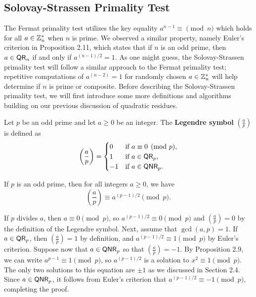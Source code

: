 \subsection{Solovay-Strassen Primality Test}
The Fermat primality test utilizes the key equality $a^{n-1} \equiv \pmod n$ which holds for all $a \in 
\mathbb{Z}_n^*$ when $n$ is prime. We observed a similar property, namely Euler's criterion in Proposition 2.11,
which states that if $n$ is an odd prime, then $a \in {\sf QR}_n$ if and only if $a^{(n-1)/2} = 1$. 
As one might guess, the Solovay-Strassen primality test will follow a similar approach to the 
Fermat primality test; repetitive computations of $a^{(n-2)} = 1$ for randomly chosen 
$a \in \mathbb{Z}_n^*$ will help determine if $n$ is prime or composite. Before describing the 
Solovay-Strassen primality test, we will first introduce some more definitions and algorithms 
building on our previous discussion of quadratic residues. 

\begin{defn}
Let $p$ be an odd prime and let $a \geq 0$ be an integer. The {\bf Legendre symbol} 
$(\frac ap)$ is defined as 
\[ \left( \frac ap \right) = \begin{cases} 0 & \text{if $a \equiv 0 \pmod p$,} \\ 1 & \text{if $a \in {\sf QR}_p$,} \\ -1 & \text{if $a \in {\sf QNR}_p$.} \end{cases} \]
\end{defn}

\begin{thm}
If $p$ is an odd prime, then for all integers $a \geq 0$, we have 
\[ \left( \frac ap \right) \equiv a^{(p-1)/2} \pmod p. \]
\end{thm}
\begin{pf}
If $p$ divides $a$, then $a \equiv 0 \pmod p$, so $a^{(p-1)/2} \equiv 0 \pmod p$ and 
$(\frac ap) = 0$ by the definition of the Legendre symbol. Next, assume that $\gcd(a, p) = 1$. 
If $a \in {\sf QR}_p$, then $(\frac ap) = 1$ by definition, and $a^{(p-1)/2} \equiv 1 \pmod p$ 
by Euler's criterion. Suppose now that $a \in {\sf QNR}_p$ so that $(\frac ap) = -1$. By Proposition 
2.9, we can write $a^{p-1} \equiv 1 \pmod p$, so $a^{(p-1)/2}$ is a solution to $x^2 \equiv 1 
\pmod p$. The only two solutions to this equation are $\pm1$ as we discussed in Section 2.4. 
Since $a \in {\sf QNR}_p$, it follows from Euler's criterion that $a^{(p-1)/2} \equiv -1 \pmod p$,
completing the proof.
\end{pf}


